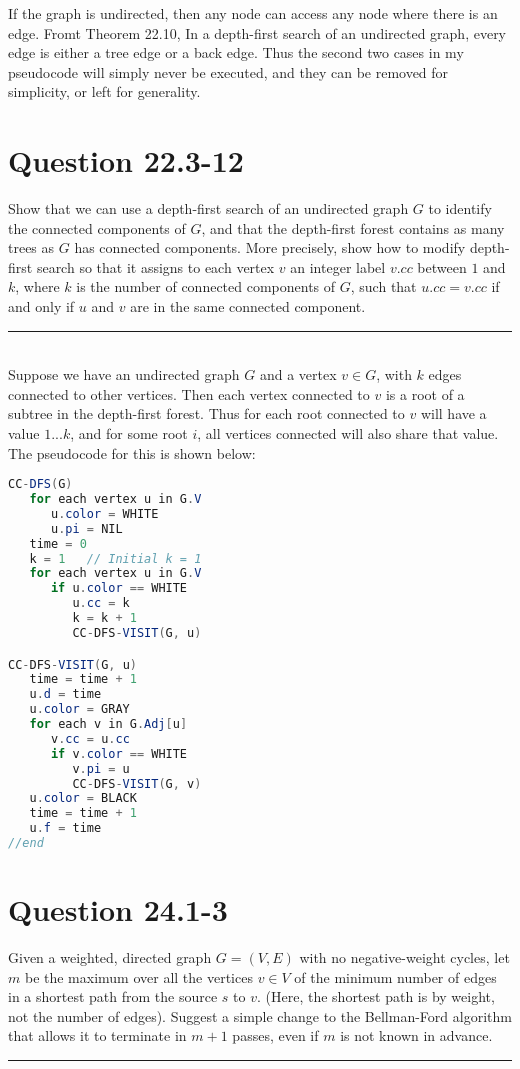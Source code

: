 \documentclass[20pt]{article} %
\begin{document}
\newpage
If the graph is undirected, then any node can access any node where there is an edge. Fromt Theorem 22.10, In a depth-first search of an undirected graph, every edge is either a tree edge or a back edge.  Thus the second two cases in my pseudocode will simply never be executed, and they can be removed for simplicity, or left for generality.

\section{Question 22.3-12} 
Show that we can use a depth-first search of an undirected graph $G$ to identify the connected components of $G$, and that the depth-first forest contains as many trees as $G$ has connected components.  More precisely, show how to modify depth-first search so that it assigns to each vertex $v$ an integer label $v.cc$ between $1$ and $k$, where $k$ is the number of connected components of $G$, such that $u.cc = v.cc$ if and only if $u$ and $v$ are in the same connected component. \\
\noindent\rule{2cm}{0.4pt} \\

Suppose we have an undirected graph $G$ and a vertex $v \in G$, with $k$ edges connected to other vertices.  Then each vertex connected to $v$ is a root of a subtree in the depth-first forest.  Thus for each root connected to $v$ will have a value $1...k$, and for some root $i$, all vertices connected will also share that value.  The pseudocode for this is shown below:

\begin{lstlisting}[language=java]
CC-DFS(G)
   for each vertex u in G.V
      u.color = WHITE
      u.pi = NIL
   time = 0
   k = 1   // Initial k = 1
   for each vertex u in G.V
      if u.color == WHITE
         u.cc = k
         k = k + 1
         CC-DFS-VISIT(G, u)

CC-DFS-VISIT(G, u)
   time = time + 1
   u.d = time
   u.color = GRAY
   for each v in G.Adj[u]
      v.cc = u.cc
      if v.color == WHITE
         v.pi = u
         CC-DFS-VISIT(G, v)
   u.color = BLACK
   time = time + 1
   u.f = time
//end
\end{lstlisting}

\newpage
\section{Question 24.1-3} 
Given a weighted, directed graph $G = (V, E)$ with no negative-weight cycles, let $m$ be the maximum over all the vertices $v \in V$ of the minimum  number of edges in a shortest path from the source $s$ to $v$.  (Here, the shortest path is by weight, not the number of edges). Suggest a simple change to the Bellman-Ford algorithm that allows it to terminate in $m + 1$ passes, even if $m$ is not known in advance. \\
\noindent\rule{2cm}{0.4pt} \\
\end{document}
